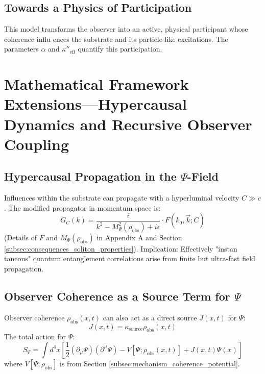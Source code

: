 \documentclass{report}
\begin{document}
    \subsection{Towards a Physics of Participation}
    \label{subsec:towards_physics_participation}
    This model transforms the observer into an active, physical participant whose coherence influ ences the substrate and its particle-like excitations. The parameters $\alpha$ and $\kappa''_{\text{eff}}$ quantify this participation.

\section{Mathematical Framework Extensions—Hypercausal Dynamics and Recursive Observer Coupling}
\label{sec:math_extensions_hypercausal_recursive}
    \subsection{Hypercausal Propagation in the $\Psi$-Field}
    \label{subsec:hypercausal_propagation_psi}
    Influences within the substrate can propagate with a hyperluminal velocity $C \gg c$. The modified
    propagator in momentum space is:
    \begin{equation}
        G_C(k) = \frac{i}{k^2 - M_{\Psi}^2(\rho_{\text{obs}}) + i\epsilon} \cdot F(k_0, \vec{k}; C)
    \end{equation}
    (Details of $F$ and $M_{\Psi}(\rho_{\text{obs}})$ in Appendix A and Section \ref{subsec:consequences_soliton_properties}). Implication: Effectively "instan taneous" quantum entanglement correlations arise from finite but ultra-fast field propagation.

    \subsection{Observer Coherence as a Source Term for $\Psi$}
    \label{subsec:observer_coherence_source_psi}
    Observer coherence $\rho_{\text{obs}}(x, t)$ can also act as a direct source $J(x, t)$ for $\Psi$:
    \begin{equation}
        J(x, t) = \kappa_{\text{source}}\rho_{\text{obs}}(x, t)
    \end{equation}
    The total action for $\Psi$:
    \begin{equation}
        S_{\Psi} = \int d^4x \left[ \frac{1}{2}(\partial_{\mu}\Psi)(\partial^{\mu}\Psi) - V[\Psi; \rho_{\text{obs}}(x, t)] + J(x, t)\Psi(x) \right]
    \end{equation}
    where $V[\Psi; \rho_{\text{obs}}]$ is from Section \ref{subsec:mechanism_coherence_potential}.
\end{document}
